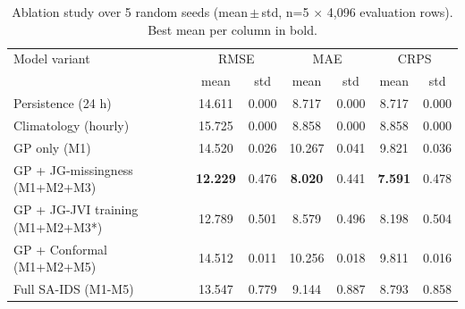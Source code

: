 \begin{table}[ht]
\centering
\caption{Ablation study over 5 random seeds (mean\,$\pm$\,std, n=5 $\times$ 4{,}096 evaluation rows). Best mean per column in bold.}
\label{tab:ablation_multiseed}
\begin{tabular}{lcccccc}
\toprule
Model variant & \multicolumn{2}{c}{RMSE} & \multicolumn{2}{c}{MAE} & \multicolumn{2}{c}{CRPS} \\
 & mean & std & mean & std & mean & std \\
\midrule
Persistence (24 h) & 14.611 & 0.000 & 8.717 & 0.000 & 8.717 & 0.000 \\
Climatology (hourly) & 15.725 & 0.000 & 8.858 & 0.000 & 8.858 & 0.000 \\
\midrule
GP only (M1) & 14.520 & 0.026 & 10.267 & 0.041 & 9.821 & 0.036 \\
GP + JG-missingness (M1+M2+M3) & \textbf{12.229} & 0.476 & \textbf{8.020} & 0.441 & \textbf{7.591} & 0.478 \\
GP + JG-JVI training (M1+M2+M3*) & 12.789 & 0.501 & 8.579 & 0.496 & 8.198 & 0.504 \\
GP + Conformal (M1+M2+M5) & 14.512 & 0.011 & 10.256 & 0.018 & 9.811 & 0.016 \\
Full SA-IDS (M1-M5) & 13.547 & 0.779 & 9.144 & 0.887 & 8.793 & 0.858 \\
\bottomrule
\end{tabular}
\end{table}
